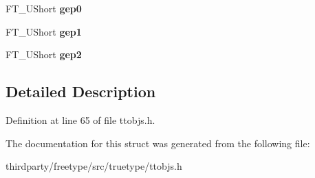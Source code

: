 \begin{DoxyCompactItemize}
\item 
\mbox{\label{struct_t_t___graphics_state___a8b6e76bd6f9493f3df09759c17d6d1c4}} 
F\+T\+\_\+\+U\+Short {\bfseries gep0}
\item 
\mbox{\label{struct_t_t___graphics_state___a4972ffa833fb9eddfef7a79f609c6597}} 
F\+T\+\_\+\+U\+Short {\bfseries gep1}
\item 
\mbox{\label{struct_t_t___graphics_state___a9e55b1d71dd655064cdb01ce68f7592a}} 
F\+T\+\_\+\+U\+Short {\bfseries gep2}
\end{DoxyCompactItemize}


\subsection{Detailed Description}


Definition at line 65 of file ttobjs.\+h.



The documentation for this struct was generated from the following file\+:\begin{DoxyCompactItemize}
\item 
thirdparty/freetype/src/truetype/ttobjs.\+h\end{DoxyCompactItemize}
